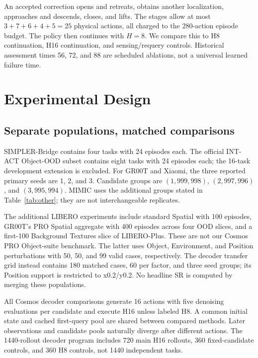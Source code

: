An accepted correction opens and retreats, obtains another localization,
approaches and descends, closes, and lifts. The stages allow at most
$3+7+6+4+5=25$ physical actions, all charged to the 280-action episode budget.
The policy then continues with $H=8$. We compare this to H8 continuation,
H16 continuation, and sensing/requery controls. Historical assessment times
56, 72, and 88 are scheduled ablations, not a universal learned failure time.

\section{Experimental Design}
\subsection{Separate populations, matched comparisons}
SIMPLER-Bridge contains four tasks with 24 episodes each. The official
INT-ACT Object-OOD subset contains eight tasks with 24 episodes each; the
16-task development extension is excluded. For GR00T and Xiaomi, the
three reported primary seeds are 1, 2, and 3. Candidate groups are
$(1,999,998)$, $(2,997,996)$, and $(3,995,994)$. MIMIC uses the additional
groups stated in Table~\ref{tab:other}; they are not interchangeable replicates.

The additional LIBERO experiments include standard Spatial with 100 episodes,
GR00T's PRO Spatial aggregate with 400 episodes across four OOD slices,
and a first-100 Background Textures slice of LIBERO-Plus. These are not
our Cosmos PRO Object-suite benchmark. The latter uses Object, Environment,
and Position perturbations with 50, 50, and 99 valid cases, respectively.
The decoder transfer grid instead contains 180 matched cases, 60 per factor,
and three seed groups; its Position support is restricted to x0.2/y0.2.
No headline SR is computed by merging these populations.

All Cosmos decoder comparisons generate 16 actions with five denoising
evaluations per candidate and execute H16 unless labeled H8. A common initial
state and cached first-query pool are shared between compared methods.
Later observations and candidate pools naturally diverge after different
actions. The 1440-rollout decoder program includes 720 main H16 rollouts,
360 fixed-candidate controls, and 360 H8 controls, not 1440 independent tasks.

